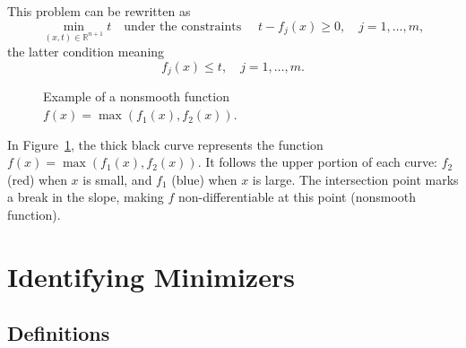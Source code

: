 This problem can be rewritten as
\begin{equation}
    \min_{(x,t)\in\mathbb{R}^{n+1}} t
    \quad \text{under the constraints } \quad
    t - f_j(x) \ge 0,\quad j=1,\dots,m,
\end{equation}
the latter condition meaning
\begin{equation}
    f_j(x) \le t,\quad j=1,\dots,m.
\end{equation}

\begin{figure}[H]
\centering
{}
\caption{Example of a nonsmooth function $f(x)=\max(f_1(x),f_2(x))$.}
\label{fig:max_func}
\end{figure}

\begin{figureexplanation}
In Figure~\ref{fig:max_func}, the thick black curve represents the function $f(x) = \max(f_1(x), f_2(x))$. It follows the upper portion of each curve: $f_2$ (red) when $x$ is small, and $f_1$ (blue) when $x$ is large. The intersection point marks a break in the slope, making $f$ non-differentiable at this point (nonsmooth function).
\end{figureexplanation}

\section{Identifying Minimizers}
\label{sec:2.2}

\subsection*{Definitions}
\label{subsec:2.2.0}

